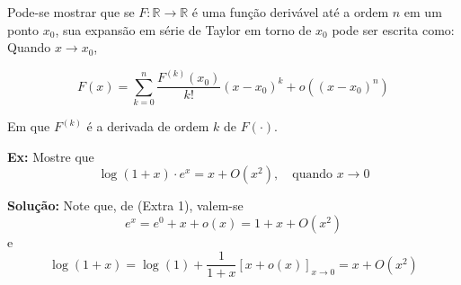 Pode-se mostrar que se $F: \mathbb{R} \to \mathbb{R}$ é uma função derivável até a ordem $n$ em um ponto $x_0$, sua expansão em série de Taylor em torno de $x_0$ pode ser escrita como: Quando $x \to x_0$,

\begin{equation}
F(x) = \sum_{k=0}^{n} \frac{F^{(k)}(x_0)}{k!} (x - x_0)^k + o\left( (x - x_0)^n \right)
\tag{Extra 1}
\end{equation}

Em que $F^{(k)}$ é a derivada de ordem $k$ de $F(\cdot)$.

\textbf{Ex:} Mostre que
\begin{equation}
\log(1+x) \cdot e^x = x + O(x^2), \quad \text{quando } x \to 0
\end{equation}

\textbf{Solução:} Note que, de (Extra 1), valem-se
\begin{equation}
e^x = e^0 + x + o(x) = 1 + x + O(x^2)
\end{equation}
e
\begin{equation}
\log(1+x) = \log(1) + \frac{1}{1+x} \left[ x + o(x) \right]_{x \to 0} = x + O(x^2)
\end{equation}